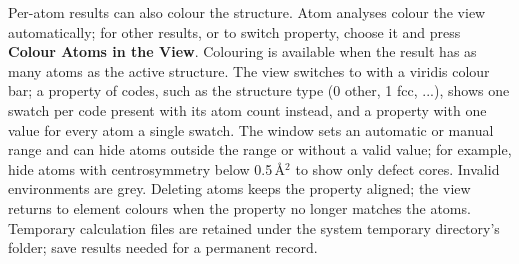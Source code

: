 Per-atom results can also colour the structure. Atom analyses colour the view automatically; for other results, or to switch property, choose it and press \textbf{Colour Atoms in the View}. Colouring is available when the result has as many atoms as the active structure. The view switches to  with a viridis colour bar; a property of codes, such as the structure type (0 other, 1 fcc, ...), shows one swatch per code present with its atom count instead, and a property with one value for every atom a single swatch. The  window sets an automatic or manual range and can hide atoms outside the range or without a valid value; for example, hide atoms with centrosymmetry below 0.5\,\AA$^2$ to show only defect cores. Invalid environments are grey. Deleting atoms keeps the property aligned; the view returns to element colours when the property no longer matches the atoms. Temporary calculation files are retained under the system temporary directory's  folder; save results needed for a permanent record.

